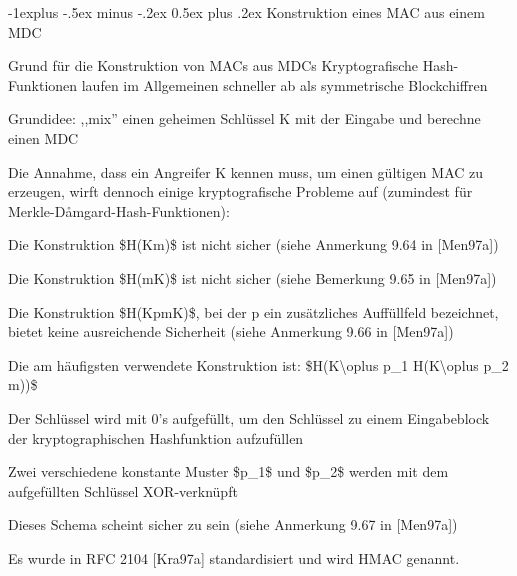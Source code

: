 \documentclass[a4paper]{article}
\makeatletter
\renewcommand{\subsection}{\@startsection{subsection}{2}{0mm}%
 {-1explus -.5ex minus -.2ex}%
 {0.5ex plus .2ex}%
 {\normalfont\normalsize\bfseries}}
\makeatother
\begin{document}
\begin{multicols}{3}
      \subsection{Konstruktion eines MAC aus einem
            MDC}

      \begin{itemize*}
            \item
            Grund für die Konstruktion von MACs aus MDCs Kryptografische
            Hash-Funktionen laufen im Allgemeinen schneller ab als symmetrische
            Blockchiffren
            \item
            Grundidee: ,,mix'' einen geheimen Schlüssel K mit der Eingabe und
            berechne einen MDC
            \item
            Die Annahme, dass ein Angreifer K kennen muss, um einen gültigen MAC
            zu erzeugen, wirft dennoch einige kryptografische Probleme auf
            (zumindest für Merkle-Dåmgard-Hash-Funktionen):

            \begin{itemize*}
                  \item Die Konstruktion \$H(K\textbar\textbar m)\$ ist nicht sicher (siehe Anmerkung 9.64 in {[}Men97a{]})
                  \item Die Konstruktion \$H(m\textbar\textbar K)\$ ist nicht sicher (siehe Bemerkung 9.65 in {[}Men97a{]})
                  \item Die Konstruktion \$H(K\textbar\textbar p\textbar\textbar m\textbar\textbar K)\$, bei der p ein zusätzliches Auffüllfeld bezeichnet, bietet keine ausreichende Sicherheit (siehe Anmerkung 9.66 in {[}Men97a{]})
            \end{itemize*}
            \item
            Die am häufigsten verwendete Konstruktion ist:
            \$H(K\textbackslash oplus p\_1\textbar\textbar{}
            H(K\textbackslash oplus p\_2\textbar\textbar{} m))\$

            \begin{itemize*}
                  \item Der Schlüssel wird mit 0's aufgefüllt, um den Schlüssel zu einem Eingabeblock der kryptographischen Hashfunktion aufzufüllen
                  \item Zwei verschiedene konstante Muster \$p\_1\$ und \$p\_2\$ werden mit dem aufgefüllten Schlüssel XOR-verknüpft
                  \item Dieses Schema scheint sicher zu sein (siehe Anmerkung 9.67 in {[}Men97a{]})
                  \item Es wurde in RFC 2104 {[}Kra97a{]} standardisiert und wird HMAC genannt.
            \end{itemize*}
      \end{itemize*}



\end{multicols}
\end{document}
